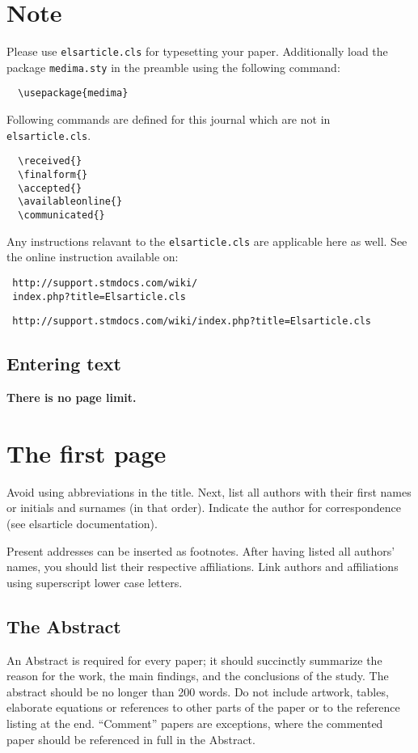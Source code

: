 \documentclass[times,twocolumn,final]{elsarticle}
\begin{document}




\section{Note}
\label{sec1}
Please use \verb+elsarticle.cls+ for typesetting your paper.
Additionally load the package \verb+medima.sty+ in the preamble using
the following command: 
\begin{verbatim} 
  \usepackage{medima}
\end{verbatim}

Following commands are defined for this journal which are not in
\verb+elsarticle.cls+. 
\begin{verbatim}
  \received{}
  \finalform{}
  \accepted{}
  \availableonline{}
  \communicated{}
\end{verbatim}

Any instructions relavant to the \verb+elsarticle.cls+ are applicable
here as well. See the online instruction available on:
\makeatletter
\if@twocolumn
\begin{verbatim}
 http://support.stmdocs.com/wiki/
 index.php?title=Elsarticle.cls
\end{verbatim}
\else
\begin{verbatim}
 http://support.stmdocs.com/wiki/index.php?title=Elsarticle.cls
\end{verbatim}
\fi

\subsection{Entering text}
\textcolor{newcolor}{\bf There is no page limit.}

\section{The first page}
Avoid using abbreviations in the title. Next, list all authors with
their first names or initials and surnames (in that order). Indicate
the author for correspondence (see elsarticle documentation).

Present addresses can be inserted as footnotes. After having listed all
authors' names, you should list their respective affiliations. Link
authors and affiliations using superscript lower case letters.

\subsection{The Abstract}
An Abstract is required for every paper; it should succinctly summarize
the reason for the work, the main findings, and the conclusions of the
study. The abstract should be no longer than 200 words. Do not include
artwork, tables, elaborate equations or references to other parts of
the paper or to the reference listing at the end. ``Comment'' papers
are exceptions, where the commented paper should be referenced in full
in the Abstract.
\end{document}
